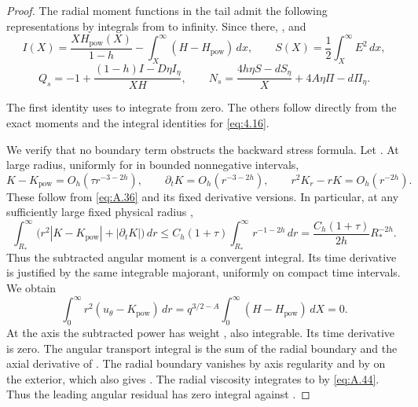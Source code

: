 \begin{proof}
The radial moment functions in the tail admit the following representations by integrals from  to
infinity. Since  there, , and
\[
  I(X)=\frac{XH_{\mathrm{pow}}(X)}{1-h}-\int_X^\infty(H-H_{\mathrm{pow}})\,dx,
  \qquad
  S(X)=\frac12\int_X^\infty E^2\,dx,
\]
\[
  Q_s=-1+\frac{(1-h)I-D\eta I_\eta}{XH},
  \qquad
  N_s=\frac{4h\eta S-dS_\eta}{X}+4A\eta\Pi-d\Pi_\eta.
\]

%
The first identity uses  to integrate  from zero. The others
follow directly from the exact moments and the integral identities for  \eqref{eq:4.16}.

We verify that no boundary term obstructs the backward stress formula. Let
. At large radius, uniformly for  in bounded
nonnegative intervals,
\begin{equation}
  K-K_{\mathrm{pow}}=O_h(\tau r^{-3-2h}),\qquad
  \partial_tK=O_h(r^{-3-2h}),\qquad
  r^2K_r-rK=O_h(r^{-2h}).
  \tag{A.44}\label{eq:A.44}
\end{equation}
These follow from \eqref{eq:A.36} and its fixed derivative versions. In particular, at any sufficiently large fixed physical
radius ,
\[
  \int_{R_*}^\infty\bigl(r^2|K-K_{\mathrm{pow}}|+|\partial_tK|\bigr)\,dr
  \leq C_h(1+\tau)\int_{R_*}^\infty r^{-1-2h}\,dr
  =\frac{C_h(1+\tau)}{2h}R_*^{-2h}.
\]
Thus the subtracted angular moment is a convergent integral. Its time derivative is justified by the same integrable majorant,
uniformly on compact time intervals. We obtain
\begin{equation}
  \int_0^\infty r^2(u_\theta-K_{\mathrm{pow}})\,dr
  =q^{3/2-A}\int_0^\infty(H-H_{\mathrm{pow}})\,dX=0.
  \tag{A.45}\label{eq:A.45}
\end{equation}
At the axis the subtracted power has weight , also integrable. Its time derivative is zero. The
angular transport integral is the sum of the radial boundary
 and the axial derivative of
. The radial boundary vanishes by axis regularity and by
 on the exterior, which also gives . The radial viscosity integrates
to  by \eqref{eq:A.44}. Thus the leading angular residual
 has zero integral against .


\end{proof}
